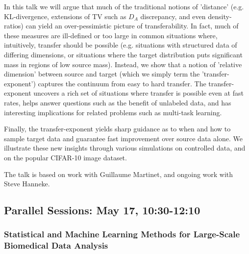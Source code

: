 \begin{itemize}
In this talk we will argue that much of the traditional notions of 'distance' (e.g. KL-divergence, extensions of 
TV such as $D_A$ discrepancy, and even density-ratios) can yield an over-pessimistic picture of transferability. 
In fact, much of these measures are ill-defined or too large in common situations where, intuitively, transfer should be possible (e.g. situations with structured data of differing dimensions, or situations where the target distribution puts significant mass in regions of low source mass). Instead, we show that a notion of 'relative dimension' between source and target (which we simply term the 'transfer-exponent') captures the continuum from easy to hard transfer. The transfer-exponent uncovers a rich set of situations where transfer is possible even at fast rates, helps answer questions such as the benefit of unlabeled data, and has interesting implications for related problems such as multi-task learning. 

Finally, the transfer-exponent yields sharp guidance as to when and how to sample target data and guarantee fast improvement over source data alone. We illustrate these new insights through various simulations on controlled data, and on the popular CIFAR-10 image dataset. 

The talk is based on work with Guillaume Martinet, and ongoing work with Steve Hanneke.

\end{itemize}

\subsection*{Parallel Sessions: May 17, 10:30-12:10}

\subsubsection*{Statistical and Machine Learning Methods for Large-Scale Biomedical Data Analysis}

